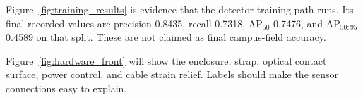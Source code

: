 Figure~\ref{fig:training_results} is evidence that the detector training path
runs. Its final recorded values are precision 0.8435, recall 0.7318,
AP$_{50}$ 0.7476, and AP$_{50:95}$ 0.4589 on that split. These are not claimed as
final campus-field accuracy.


Figure~\ref{fig:hardware_front} will show the enclosure, strap, optical contact
surface, power control, and cable strain relief. Labels should make the sensor
connections easy to explain.
